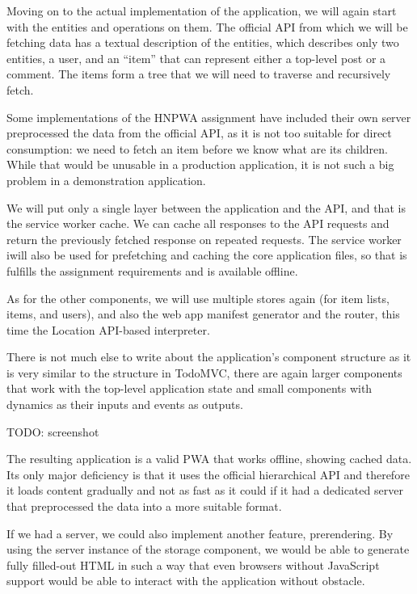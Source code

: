 \documentclass[english,odsaz]{fitthesis}
\begin{document}
Moving on to the actual implementation of the application, we will again start
with the entities and operations on them. The official API from which we will be
fetching data has a textual description of the entities, which describes only
two entities, a user, and an ``item'' that can represent either a top-level
post or a comment. The items form a tree that we will need to traverse and
recursively fetch.

Some implementations of the HNPWA assignment have included their own server
preprocessed the data from the official API, as it is not too suitable for
direct consumption: we need to fetch an item before we know what are its
children. While that would be unusable in a production application, it is not
such a big problem in a demonstration application.

We will put only a single layer between the application and the API, and that is
the service worker cache. We can cache all responses to the API requests and
return the previously fetched response on repeated requests. The service worker
iwill also be used for prefetching and caching the core application files, so
that is fulfills the assignment requirements and is available offline.

As for the other components, we will use multiple stores again (for item lists,
items, and users), and also the web app manifest generator and the router, this
time the Location API-based interpreter.

There is not much else to write about the application's component structure as
it is very similar to the structure in TodoMVC, there are again larger
components that work with the top-level application state and small components
with dynamics as their inputs and events as outputs.

TODO: screenshot

The resulting application is a valid PWA that works offline, showing cached
data. Its only major deficiency is that it uses the official hierarchical API
and therefore it loads content gradually and not as fast as it could if it had a
dedicated server that preprocessed the data into a more suitable format.

If we had a server, we could also implement another feature, prerendering. By
using the server instance of the storage component, we would be able to generate
fully filled-out HTML in such a way that even browsers without JavaScript
support would be able to interact with the application without obstacle.
\end{document}
